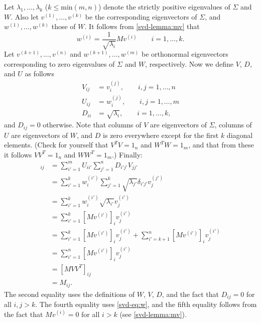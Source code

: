 \documentclass{article}
\theoremstyle{definition}
\begin{document}
Let $\lambda_1,\dots,\lambda_k$ ($k\le \text{min}(m, n)$) denote the strictly positive eigenvalues of $\Sigma$ and $W$. Also let $v^{(1)},\dots,v^{(k)}$ be the corresponding eigenvectors of $\Sigma$, and $w^{(1)},\dots,w^{(k)}$ those of $W$. It follows from \ref{svd-lemma:mv} that
\begin{equation}
    w^{(i)} = \frac{1}{\sqrt{\lambda_i}}Mv^{(i)} \qquad i=1,\dots,k.
    \label{svd-eq:w}
\end{equation}
Let $v^{(k+1)},\dots,v^{(n)}$ and $w^{(k+1)},\dots,w^{(m)}$ be orthonormal eigenvectors corresponding to zero eigenvalues of $\Sigma$ and $W$, respectively. Now we define $V$, $D$, and $U$ as follows
\begin{align*}
    V_{ij} &= v^{(j)}_i, \qquad i,j=1,\dots,n\\
    U_{ij} &= w^{(j)}_i, \qquad i,j=1,\dots,m\\
    D_{ii} &= \sqrt{\lambda_i}, \qquad i=1,\dots,k,
\end{align*}
and $D_{ij}=0$ otherwise. Note that columns of $V$ are eigenvectors of $\Sigma$, columns of $U$ are eigenvectors of $W$, and $D$ is zero everywhere except for the first $k$ diagonal elements.
(Check for yourself that $V^TV=1_{n}$ and $W^TW=1_{m}$, and that from these it follows $VV^T=1_{n}$ and $WW^T=1_{m}$.)
Finally:
\begin{align*}
    [UDV^T]_{ij} &= \sum_{i'=1}^{m}U_{ii'}\sum_{j'=1}^{n}D_{i'j'}V_{jj'} \\
    &= \sum_{i'=1}^{k}w^{(i')}_i\sum_{j'=1}^{k}\sqrt{\lambda_{j'}}\delta_{i'j'}v^{(j')}_{j} \\
    &= \sum_{i'=1}^{k}w^{(i')}_i\sqrt{\lambda_{i'}}v^{(i')}_{j}\\
    &= \sum_{i'=1}^{k}[Mv^{(i')}]_iv^{(i')}_{j}\\
    &= \sum_{i'=1}^{k}[Mv^{(i')}]_iv^{(i')}_{j} + \sum_{i'=k+1}^{n}[Mv^{(i')}]_iv^{(i')}_{j}\\
    &= \sum_{i'=1}^{n}[Mv^{(i')}]_iv^{(i')}_{j}\\
    & = [MVV^T]_{ij}\\
    & = M_{ij}.
\end{align*}
The second equality uses the definitions of $W$, $V$, $D$, and the fact that $D_{ij}=0$ for all $i,j>k$. The fourth equality uses \eqref{svd-eq:w}, and the fifth equality follows from the fact that $Mv^{(i)}=0$ for all $i>k$ (see \eqref{svd-lemma:mv}).


\end{document}
